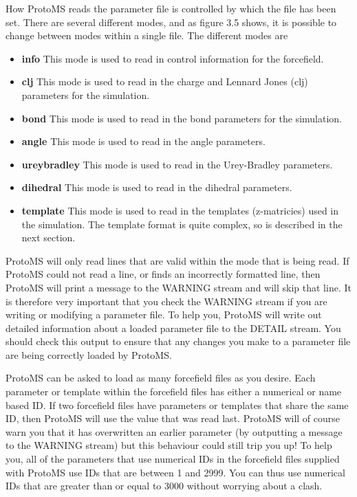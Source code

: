 \documentclass[letterpaper,10pt,english]{sphinxmanual}
\begin{document}
How ProtoMS reads the parameter file is controlled by which  the file has been set. There are several different modes, and as figure 3.5 shows, it is possible to change between modes within a single file. The different modes are
\begin{itemize}
\item {} 
\textbf{info} This mode is used to read in control information for the forcefield.

\item {} 
\textbf{clj} This mode is used to read in the charge and Lennard Jones (clj) parameters for the simulation.

\item {} 
\textbf{bond} This mode is used to read in the bond parameters for the simulation.

\item {} 
\textbf{angle} This mode is used to read in the angle parameters.

\item {} 
\textbf{ureybradley} This mode is used to read in the Urey-Bradley parameters.

\item {} 
\textbf{dihedral} This mode is used to read in the dihedral parameters.

\item {} 
\textbf{template} This mode is used to read in the templates (z-matricies) used in the simulation. The template format is quite complex, so is described in the next section.

\end{itemize}

ProtoMS will only read lines that are valid within the mode that is being read. If ProtoMS could not read a line, or finds an incorrectly formatted line, then ProtoMS will print a message to the WARNING stream and will skip that line. It is therefore very important that you check the WARNING stream if you are writing or modifying a parameter file. To help you, ProtoMS will write out detailed information about a loaded parameter file to the DETAIL stream. You should check this output to ensure that any changes you make to a parameter file are being
correctly loaded by ProtoMS.

ProtoMS can be asked to load as many forcefield files as you desire. Each parameter or template within the forcefield files has either a numerical or name based ID. If two forcefield files have parameters or templates that share the same ID, then ProtoMS will use the value that was read last. ProtoMS will of course warn you that it has overwritten an earlier parameter (by outputting a message to the WARNING stream) but this behaviour could still trip you up! To help you, all of the parameters that use numerical IDs in the forcefield files supplied with ProtoMS use IDs that are between 1 and 2999. You can thus use numerical IDs that are greater than or equal to 3000 without worrying about a clash.
\end{document}
